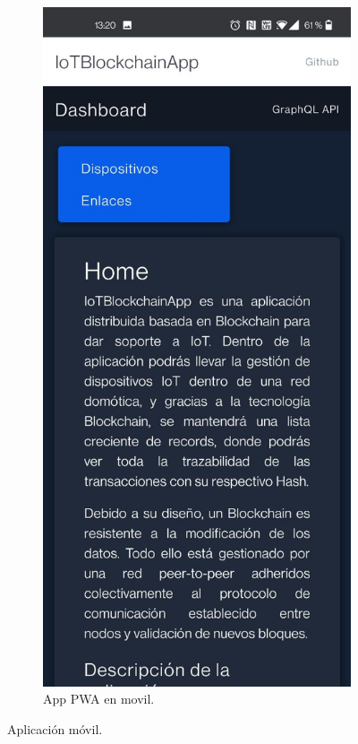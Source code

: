\begin{figure}[h!]
\begin{subfigure}{0.5\textwidth}
    \includegraphics[width=\linewidth]{imagenes/desarrollo/web/pwa/app_movil}
    \caption{App PWA en movil.}
    \label{fig:app-movil}
  \end{subfigure}
  \caption{Aplicación móvil.}
  \label{fig:aplicacion-movil}
\end{figure}

\newpage